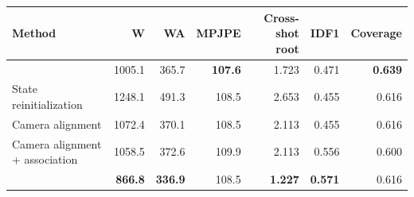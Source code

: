 \begin{tabular}{lrrrrrr}
\toprule
Method & W & WA & MPJPE & Cross-shot root & IDF1 & Coverage \\
\midrule
\humanthree{} & 1005.1 & 365.7 & \textbf{107.6} & 1.723 & 0.471 & \textbf{0.639} \\
State reinitialization & 1248.1 & 491.3 & 108.5 & 2.653 & 0.455 & 0.616 \\
Camera alignment & 1072.4 & 370.1 & 108.5 & 2.113 & 0.455 & 0.616 \\
Camera alignment + association & 1058.5 & 372.6 & 109.9 & 2.113 & 0.556 & 0.600 \\
\textbf{\method{}} & \textbf{866.8} & \textbf{336.9} & 108.5 & \textbf{1.227} & \textbf{0.571} & 0.616 \\
\bottomrule
\end{tabular}

